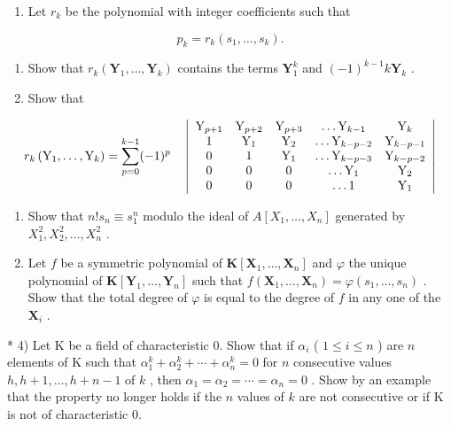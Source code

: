 \BourbakiExerciseGroup

\begin{enumerate}
\def\labelenumi{\arabic{enumi})}
\tightlist
\item
  Let \(r_k\) be the polynomial with integer coefficients such that
\end{enumerate}

\[
p _ {k} = r _ {k} (s _ {1}, \dots , s _ {k}).
\]

\begin{enumerate}
\def\labelenumi{\alph{enumi})}
\item
  Show that \(r_k(\mathbf{Y}_1, \ldots, \mathbf{Y}_k)\) contains the terms \(\mathbf{Y}_1^k\) and \((-1)^{k-1} k\mathbf{Y}_k\) .
\item
  Show that
\end{enumerate}

\[
r _ {k} \left(\mathrm{Y} _ {1}, \dots , \mathrm{Y} _ {k}\right) = \sum_ {p = 0} ^ {k - 1} (- 1) ^ {p} \quad \left| \begin{array}{c c c c c} \mathrm{Y} _ {p + 1} & \mathrm{Y} _ {p + 2} & \mathrm{Y} _ {p + 3} & \dots \mathrm{Y} _ {k - 1} & \mathrm{Y} _ {k} \\ 1 & \mathrm{Y} _ {1} & \mathrm{Y} _ {2} & \dots \mathrm{Y} _ {k - p - 2} & \mathrm{Y} _ {k - p - 1} \\ 0 & 1 & \mathrm{Y} _ {1} & \dots \mathrm{Y} _ {k - p - 3} & \mathrm{Y} _ {k - p - 2} \\ 0 & 0 & 0 & \dots \mathrm{Y} _ {1} & \mathrm{Y} _ {2} \\ 0 & 0 & 0 & \dots 1 & \mathrm{Y} _ {1} \end{array} \right|
\]

\begin{enumerate}
\def\labelenumi{\arabic{enumi})}
\setcounter{enumi}{1}
\item
  Show that \(n! s_n \equiv s_1^n\) modulo the ideal of \(A[X_1, \ldots, X_n]\) generated by \(X_1^2, X_2^2, \ldots, X_n^2\) .
\item
  Let \(f\) be a symmetric polynomial of \(\mathbf{K}[\mathbf{X}_1, \ldots, \mathbf{X}_n]\) and \(\varphi\) the unique polynomial of \(\mathbf{K}[\mathbf{Y}_1, \ldots, \mathbf{Y}_n]\) such that \(f(\mathbf{X}_1, \ldots, \mathbf{X}_n) = \varphi(s_1, \ldots, s_n)\) . Show that the total degree of \(\varphi\) is equal to the degree of \(f\) in any one of the \(\mathbf{X}_i\) .
\end{enumerate}

* 4) Let K be a field of characteristic 0. Show that if \(\alpha_{i}\) ( \(1 \leqslant i \leqslant n\) ) are \(n\) elements of K such that \(\alpha_{1}^{k} + \alpha_{2}^{k} + \cdots + \alpha_{n}^{k} = 0\) for \(n\) consecutive values \(h, h+1, \ldots, h+n-1\) of \(k\) , then \(\alpha_{1} = \alpha_{2} = \cdots = \alpha_{n} = 0\) . Show by an example that the property no longer holds if the \(n\) values of \(k\) are not consecutive or if K is not of characteristic 0.

